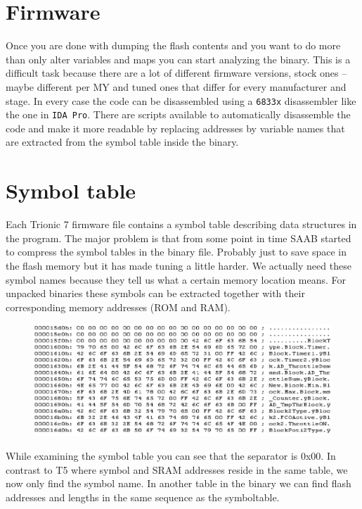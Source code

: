 \documentclass[11pt,a4paper]{book}
\begin{document}
\chapter{Firmware}
Once you are done with dumping the flash contents and you want to do more than
only alter variables and maps you can start analyzing the binary. This is a
difficult task because there are a lot of different firmware versions, stock
ones – maybe different per MY and tuned ones that differ for every manufacturer
and stage. In every case the code can be disassembled using a \texttt{6833x}
disassembler like the one in \texttt{IDA Pro}. There are scripts
available to automatically disassemble the code and make it more readable by
replacing addresses by variable names that are extracted from the symbol
table inside the binary.

\chapter{Symbol table}
Each Trionic 7 firmware file contains a symbol table describing data structures in the
program. The major problem is that from some point in time SAAB started to
compress the symbol tables in the binary file. Probably just to save space in
the flash memory but it has made tuning a little harder. We actually need these
symbol names because they tell us what a certain memory location means. For
unpacked binaries these symbols can be extracted together with their
corresponding memory addresses (ROM and RAM).

\begin{figure}[]
    \centering
    \includegraphics{symboltable.png}
    \caption{}
    \label{fig:}
\end{figure}

While examining the symbol table you can see that the separator is 0x00. In
contrast to T5 where symbol and SRAM addresses reside in the same table, we now
only find the symbol name. In another table in the binary we can find flash
addresses and lengths in the same sequence as the symboltable.
\end{document}
